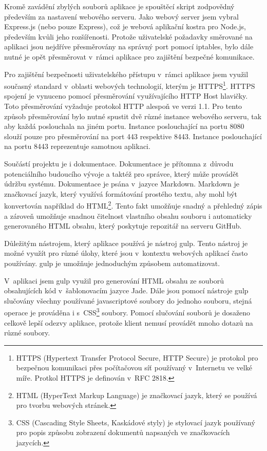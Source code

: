 \documentclass[thesis=M,czech]{FITthesis}[2012/06/26]
\begin{document}
    Kromě zavádění zbylých souborů aplikace je spouštěcí skript
    zodpovědný především za nastavení webového serveru.
    Jako webový server jsem vybral Express.js (nebo pouze Express),
    což je webová aplikační kostra pro Node.js,
    především kvůli jeho rozšířenosti.
    Protože uživatelské požadavky směrované na aplikaci jsou 
    nejdříve přesměrovány na správný port pomocí iptables,
    bylo dále nutné je opět přesměrovat v~rámci aplikace pro zajištění bezpečné komunikace.

    Pro zajištění bezpečnosti uživatelského přístupu v~rámci aplikace
    jsem využil současný standard v~oblasti webových technologií, kterým je HTTPS\footnote{
      HTTPS (Hypertext Transfer Protocol Secure, HTTP Secure) je protokol pro bezpečnou komunikaci přes počítačovou síť 
      používaný v~Internetu ve velké míře.
      Protkol HTTPS je definován v~RFC 2818.
    }.
    HTTPS spojení je vynuceno pomocí přesměrování využívajícího HTTP Host hlavičky.
    Toto přesměrování vyžaduje protokol HTTP alespoň ve verzi 1.1.
    Pro tento způsob přesměrování bylo nutné
    spustit dvě různé instance webového serveru, tak aby každá poslouchala na jiném portu.
    Instance poslouchající na portu 8080 slouží pouze pro přesměrování na port 443 respektive 8443.
    Instance poslouchající na portu 8443 reprezentuje samotnou aplikaci.

    Součástí projektu je i dokumentace.
    Dokumentace je přítomna z~důvodu potenciálního budoucího vývoje a taktéž pro správce,
    který může provádět údržbu systému.
    Dokumentace je psána v~jazyce Markdown.
    Markdown je značkovací jazyk, který využívá formátování prostého textu,
    aby mohl být konvertován například do HTML\footnote{
      HTML (HyperText Markup Language) je značkovací jazyk, který se používá pro tvorbu webových stránek.
    }.
    Tento fakt umožňuje snadný a přehledný zápis
    a zároveň umožňuje snadnou čitelnost vlastního obsahu souboru i automaticky generovaného HTML obsahu, 
    který poskytuje repozitář na serveru GitHub.

    Důležitým nástrojem, který aplikace používá je nástroj gulp.
    Tento nástroj je možné využít pro různé úlohy,
    které jsou v~kontextu webových aplikací často používány.
    gulp je umožňuje jednoduchým způsobem automatizovat.

    V~aplikaci jsem gulp využil pro generování HTML obsahu ze souborů 
    obsahujících kód v~šablonovacím jazyce Jade.
    Dále jsou pomocí nástroje gulp slučovány všechny používané javascriptové soubory do jednoho souboru,
    stejná operace je prováděna i s~CSS\footnote{
      CSS (Cascading Style Sheets, Kaskádové styly) je stylovací jazyk používaný 
      pro popis způsobu zobrazení dokumentů napsaných ve značkovacích jazycích.
    }
    soubory.
    Pomocí slučování souborů je dosaženo celkově lepší odezvy aplikace,
    protože klient nemusí provádět mnoho dotazů na různé soubory.
    
\end{document}
